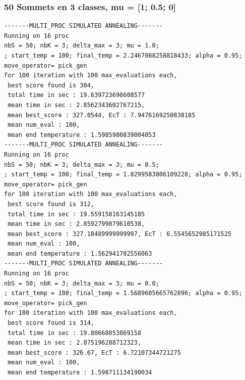 \documentclass[a4paper]{article}
\begin{document}
\subsubsection{50 Sommets en 3 classes, mu = [1; 0.5; 0]}
\begin{verbatim}
-------MULTI_PROC SIMULATED ANNEALING-------
Running on 16 proc
nbS = 50; nbK = 3; delta_max = 3; mu = 1.0;
; start_temp = 100; final_temp = 2.2467088258818433; alpha = 0.95; move_operator= pick_gen
for 100 iteration with 100 max_evaluations each, 
 best score found is 304,
 total time in sec : 19.639723698608577
 mean time in sec : 2.8562343602767215,
 mean best_score : 327.0544, EcT : 7.9476169250838185
 mean num_eval : 100,
 mean end temperature : 1.5985980839004053
-------MULTI_PROC SIMULATED ANNEALING-------
Running on 16 proc
nbS = 50; nbK = 3; delta_max = 3; mu = 0.5;
; start_temp = 100; final_temp = 1.8299583806109228; alpha = 0.95; move_operator= pick_gen
for 100 iteration with 100 max_evaluations each, 
 best score found is 312,
 total time in sec : 19.559158163145185
 mean time in sec : 2.8592799879610538,
 mean best_score : 327.18489999999997, EcT : 6.5545652985171525
 mean num_eval : 100,
 mean end temperature : 1.562941702556063
-------MULTI_PROC SIMULATED ANNEALING-------
Running on 16 proc
nbS = 50; nbK = 3; delta_max = 3; mu = 0.0;
; start_temp = 100; final_temp = 1.5689605665762896; alpha = 0.95; move_operator= pick_gen
for 100 iteration with 100 max_evaluations each, 
 best score found is 314,
 total time in sec : 19.80668053869158
 mean time in sec : 2.875196288712323,
 mean best_score : 326.67, EcT : 6.72107344721275
 mean num_eval : 100,
 mean end temperature : 1.598711134190034
\end{verbatim}
\end{document}
